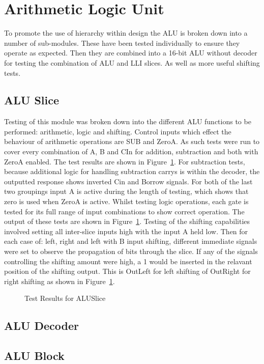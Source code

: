 
\section{Arithmetic Logic Unit}

To promote the use of hierarchy within design the ALU is broken down into a number of sub-modules. These have been tested individually to ensure they operate as expected. Then they are combined into a 16-bit ALU without decoder for testing the combination of ALU and LLI slices. As well as more useful shifting tests. 

\subsection{ALU Slice}
Testing of this module was broken down into the different ALU functions to be performed: arithmetic, logic and shifting. Control inputs which effect the behaviour of arithmetic operations are SUB and ZeroA. As such tests were run to cover every combination of A, B and CIn for addition, subtraction and both with ZeroA enabled. The test results are shown in Figure~\ref{fig:ALUSliceRes}. For subtraction tests, because additional logic for handling subtraction carrys is within the decoder, the outputted response shows inverted Cin and Borrow signals. For both of the last two groupings input A is active during the length of testing, which shows that zero is used when ZeroA is active. Whilst testing logic operations, each gate is tested for its full range of input combinations to show correct operation. The output of these tests are shown in Figure~\ref{fig:ALUSliceRes}. Testing of the shifting capabilities involved setting all inter-slice inputs high with the input A held low. Then for each case of: left, right and left with B input shifting, different immediate signals were set to observe the propagation of bits through the slice. If any of the signals controlling the shifting amount were high, a 1 would be inserted in the relavant position of the shifting output. This is OutLeft for left shifting of OutRight for right shifting as shown in Figure~\ref{fig:ALUSliceRes}.

\begin{figure}[h]
	\caption{Test Results for ALUSlice}
	\label{fig:ALUSliceRes}
\end{figure}

\subsection{ALU Decoder}


\subsection{ALU Block}

